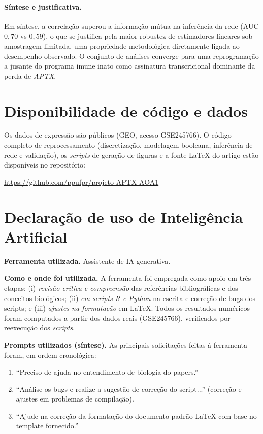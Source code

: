 \documentclass[10pt,letterpaper]{article}
\newcommand{\gene}[1]{\textit{#1}}
\begin{document}
\paragraph{Síntese e justificativa.} Em síntese, a correlação superou a
informação mútua na inferência da rede (AUC \(0{,}70\) vs \(0{,}59\)), o que se
justifica pela maior robustez de estimadores lineares sob amostragem limitada, uma propriedade metodológica diretamente ligada ao desempenho observado. O
conjunto de análises converge para uma reprogramação a jusante do programa imune
inato como assinatura transcricional dominante da perda de \gene{APTX}.


\section*{Disponibilidade de código e dados}
Os dados de expressão são públicos (GEO, acesso GSE245766). O código completo de
reprocessamento (discretização, modelagem booleana, inferência de rede e
validação), os \emph{scripts} de geração de figuras e a fonte \LaTeX{} do artigo
estão disponíveis no repositório:
\begin{center}
\url{https://github.com/ppufpr/projeto-APTX-AOA1}
\end{center}

\section*{Declaração de uso de Inteligência Artificial}
\textbf{Ferramenta utilizada.} Assistente de IA generativa.\newline

\textbf{Como e onde foi utilizada.} A ferramenta foi empregada como apoio em
três etapas: (i) \emph{revisão crítica e compreensão} das referências bibliográficas e dos conceitos biológicos;
(ii) \emph{em scripts R e Python} na escrita e correção de bugs dos scripts; e
(iii) \emph{ajustes na formatação} em \LaTeX{}.\newline \newline
Todos os resultados numéricos foram
computados a partir dos dados reais (GSE245766), verificados por reexecução dos
\emph{scripts}.\newline

\textbf{Prompts utilizados (síntese).} As principais solicitações feitas à
ferramenta foram, em ordem cronológica:
\begin{enumerate}
\item ``Preciso de ajuda no entendimento de biologia do papers.''
\item ``Análise os bugs e realize a sugestão de correção do script...'' (correção e ajustes em problemas de compilação).
\item ``Ajude na correção da formatação do documento padrão \LaTeX{} com base no template fornecido.''
\end{enumerate}
\end{document}
